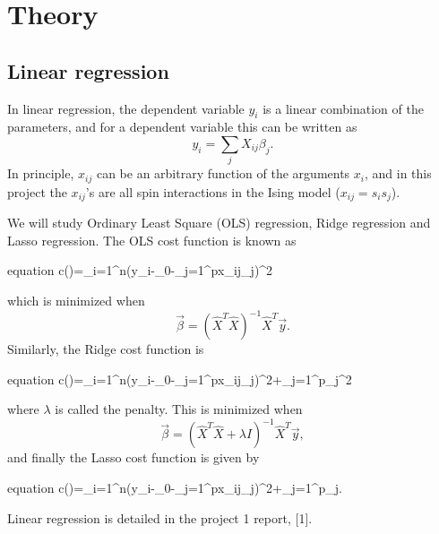 \section{Theory} \label{sec:theory}

\subsection{Linear regression}
In linear regression, the dependent variable $y_i$ is a linear combination of the parameters, and for a dependent variable this can be written as
	\begin{equation}
	y_i=\sum_jX_{ij}\beta_j.
	\end{equation}
	In principle, $x_{ij}$ can be an arbitrary function of the arguments $x_i$, and in this project the $x_{ij}$'s are all spin interactions in the Ising model ($x_{ij}=s_is_j$).
	
	We will study Ordinary Least Square (OLS) regression, Ridge regression and Lasso regression. The OLS cost function is known as
	\begin{empheq}[box={\mybluebox[5pt]}]{equation}
	c(\vec{\beta})=\sum_{i=1}^{n}\Big(y_i-\beta_0-\sum_{j=1}^px_{ij}\beta_j\Big)^2\qquad\qquad\qquad{}
	\end{empheq}
	which is minimized when
	\begin{equation}
	\vec{\beta}=(\hat{X}^T\hat{X})^{-1}\hat{X}^T\vec{y}.
	\end{equation}
	Similarly, the Ridge cost function is
	\begin{empheq}[box={\mybluebox[5pt]}]{equation}
	c(\vec{\beta})=\sum_{i=1}^{n}\Big(y_i-\beta_0-\sum_{j=1}^px_{ij}\beta_j\Big)^2+\lambda\sum_{j=1}^p\beta_j^2\qquad{}
	\end{empheq}
	where $\lambda$ is called the penalty. This is minimized when
	\begin{equation}
	\vec{\beta}=(\hat{X}^T\hat{X}+\lambda I)^{-1}\hat{X}^T\vec{y},
	\end{equation}
	and finally the Lasso cost function is given by
	\begin{empheq}[box={\mybluebox[5pt]}]{equation}
	c(\vec{\beta})=\sum_{i=1}^{n}\Big(y_i-\beta_0-\sum_{j=1}^px_{ij}\beta_j\Big)^2+\lambda\sum_{j=1}^p\beta_j\qquad{}.
	\end{empheq}
Linear regression is detailed in the project 1 report, [1].



